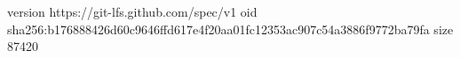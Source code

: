 version https://git-lfs.github.com/spec/v1
oid sha256:b176888426d60c9646ffd617e4f20aa01fc12353ac907c54a3886f9772ba79fa
size 87420
